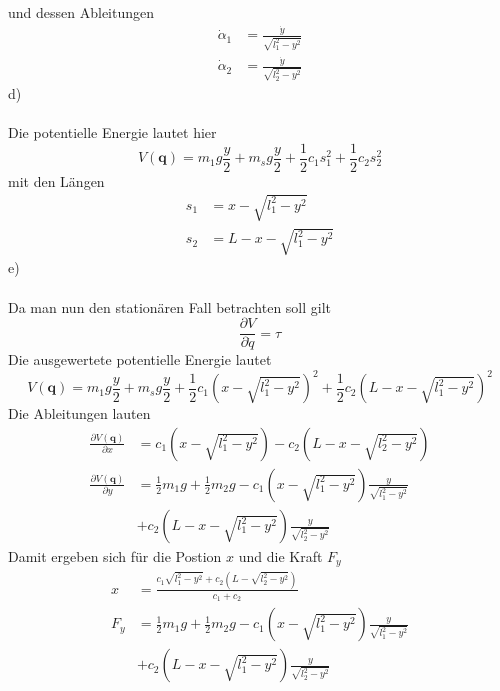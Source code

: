 und dessen Ableitungen
\begin{align*}
	\dot{\alpha}_1 &= \frac{\dot{y}}{\sqrt{l_1^2 - y^2}} \\
	\dot{\alpha}_2 &= \frac{\dot{y}}{\sqrt{l_2^2 - y^2}}
\end{align*}
d)\\ \\
Die potentielle Energie lautet hier
\[
	V(\textbf{q}) = m_1g\frac{y}{2} + m_sg\frac{y}{2} + \frac{1}{2}c_1s_1^2 + \frac{1}{2}c_2s_2^2
\]
mit den Längen
\begin{align*}
	s_1 &= x - \sqrt{l_1^2 - y^2} \\
	s_2 &= L - x - \sqrt{l_1^2 - y^2}
\end{align*}
e) \\ \\ 
Da man nun den stationären Fall betrachten soll gilt
\[
	\frac{\partial V}{\partial \dot{q}} = \tau
\]
Die ausgewertete potentielle Energie lautet
\[
	V(\textbf{q}) = m_1g\frac{y}{2} + m_sg\frac{y}{2} + \frac{1}{2}c_1\left(x - \sqrt{l_1^2 - y^2}\right)^2 + \frac{1}{2}c_2\left(L - x - \sqrt{l_1^2 - y^2}\right)^2
\]
\newpage
\noindent
Die Ableitungen lauten
\begin{align*}	
	\frac{\partial V(\textbf{q})}{\partial x} &= c_1\left(x - \sqrt{l_1^2 - y^2}\right) - c_2\left(L - x - \sqrt{l_2^2 - y^2}\right) \\
	\frac{\partial V(\textbf{q})}{\partial y} &= \frac{1}{2}m_1g + \frac{1}{2}m_2g - c_1\left(x - \sqrt{l_1^2 - y^2}\right)\frac{y}{\sqrt{l_1^2 - y^2}} \\
	& + c_2\left(L - x - \sqrt{l_1^2 - y^2}\right)\frac{y}{\sqrt{l_2^2 - y^2}} 
\end{align*}
Damit ergeben sich für die Postion $x$ und die Kraft $F_y$
\begin{align*}
	x &= \frac{c_1\sqrt{l_1^2 - y^2} + c_2(L - \sqrt{l_2^2 - y^2})}{c_1 + c_2} \\
	F_y &= \frac{1}{2}m_1g + \frac{1}{2}m_2g - c_1\left(x - \sqrt{l_1^2 - y^2}\right)\frac{y}{\sqrt{l_1^2 - y^2}} \\
		& + c_2\left(L - x - \sqrt{l_1^2 - y^2}\right)\frac{y}{\sqrt{l_2^2 - y^2}} 
\end{align*}